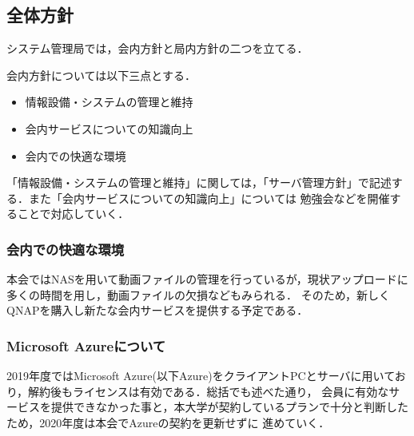 \subsection*{全体方針}


システム管理局では，会内方針と局内方針の二つを立てる．

会内方針については以下三点とする．
\begin{itemize}
    \item 情報設備・システムの管理と維持
    \item 会内サービスについての知識向上
    \item 会内での快適な環境
  \end{itemize}

「情報設備・システムの管理と維持」に関しては，「サーバ管理方針」で記述する．また「会内サービスについての知識向上」については
勉強会などを開催することで対応していく．
\subsubsection*{会内での快適な環境}
本会ではNASを用いて動画ファイルの管理を行っているが，現状アップロードに多くの時間を用し，動画ファイルの欠損などもみられる．
そのため，新しくQNAPを購入し新たな会内サービスを提供する予定である．

\subsubsection*{Microsoft Azureについて}
2019年度ではMicrosoft Azure(以下Azure)をクライアントPCとサーバに用いており，解約後もライセンスは有効である．総括でも述べた通り，
会員に有効なサービスを提供できなかった事と，本大学が契約しているプランで十分と判断したため，2020年度は本会でAzureの契約を更新せずに
進めていく．



  